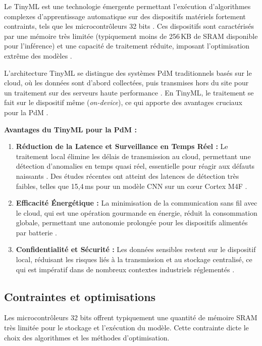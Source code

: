 Le TinyML est une technologie émergente permettant l'exécution d'algorithmes complexes d'apprentissage automatique sur des dispositifs matériels fortement contraints, tels que les microcontrôleurs 32 bits \cite{tsoukas2024}. Ces dispositifs sont caractérisés par une mémoire très limitée (typiquement moins de 256\,KB de SRAM disponible pour l'inférence) et une capacité de traitement réduite, imposant l'optimisation extrême des modèles \cite{njor2024}.

L'architecture TinyML se distingue des systèmes PdM traditionnels basés sur le cloud, où les données sont d'abord collectées, puis transmises hors du site pour un traitement sur des serveurs haute performance \cite{njor2024}. En TinyML, le traitement se fait sur le dispositif même (\textit{on-device}), ce qui apporte des avantages cruciaux pour la PdM \cite{tsoukas2024}.

\textbf{Avantages du TinyML pour la PdM :}
\begin{enumerate}
\item \textbf{Réduction de la Latence et Surveillance en Temps Réel :} Le traitement local élimine les délais de transmission au cloud, permettant une détection d'anomalies en temps quasi réel, essentielle pour réagir aux défauts naissants \cite{arciniegas2025,tsoukas2024}. Des études récentes ont atteint des latences de détection très faibles, telles que 15,4\,ms pour un modèle CNN sur un cœur Cortex M4F \cite{langer2025}.

\item \textbf{Efficacité Énergétique :} La minimisation de la communication sans fil avec le cloud, qui est une opération gourmande en énergie, réduit la consommation globale, permettant une autonomie prolongée pour les dispositifs alimentés par batterie \cite{tsoukas2024}.

\item \textbf{Confidentialité et Sécurité :} Les données sensibles restent sur le dispositif local, réduisant les risques liés à la transmission et au stockage centralisé, ce qui est impératif dans de nombreux contextes industriels réglementés \cite{njor2024,tsoukas2024}.
\end{enumerate}

\subsection{Contraintes et optimisations}

Les microcontrôleurs 32 bits offrent typiquement une quantité de mémoire SRAM très limitée pour le stockage et l'exécution du modèle. Cette contrainte dicte le choix des algorithmes et les méthodes d'optimisation.

